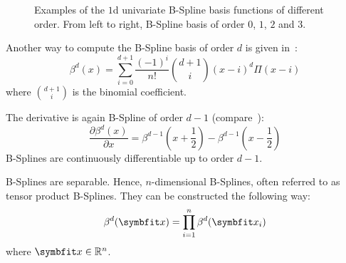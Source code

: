 \begin{figure}
	\centering
	\caption{Examples of the \(1\)d univariate B-Spline basis functions of different order. From
		left to right, B-Spline basis of order \(0\), \(1\), \(2\) and \(3\).
	}\label{fig:bspline_basis_1d}
\end{figure}

Another way to compute the B-Spline basis of order \(d\) is given in~\cite{unser_fast_1991}:
\begin{equation}
	\beta^d(x) = \sum_{i=0}^{d+1} \frac{(-1)^i}{n!} \binom{d+1}{i}(x - i)^d\Pi(x - i)
\end{equation}
where \(\binom{d+1}{i}\) is the binomial coefficient.

The derivative is again B-Spline of order \(d-1\) (compare~\cite{unser_splines_1999}):
\begin{equation}
	\frac{\partial \beta^d(x)}{\partial x} = \beta^{d-1}\left(x + \frac{1}{2}\right) -
	\beta^{d-1}\left(x - \frac{1}{2}\right)
\end{equation}
B-Splines are continuously differentiable up to order \(d-1\).

B-Splines are separable. Hence, \(n\)-dimensional B-Splines, often referred to as tensor product
B-Splines. They can be constructed the following way:
\begin{equation}
	\beta^d(\mvec{x}) = \prod^n_{i=1} \beta^d(\mvec{x}_i)
\end{equation}
where \(\mvec{x} \in \mathbb{R}^n\).

